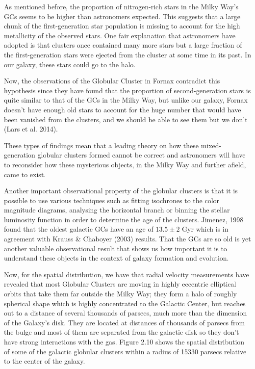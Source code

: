 As mentioned before, the proportion of nitrogen-rich stars in the Milky Way's GCs seems to be higher than astronomers expected. This suggests that a large chunk of the first-generation star population is missing to account for the high metallicity of the observed stars. One fair explanation that astronomers have adopted is that clusters once contained many more stars but a large fraction of the first-generation stars were ejected from the cluster at some time in its past. In our galaxy, these stars could go to the halo.

Now, the observations of the Globular Cluster in Fornax contradict this hypothesis since they have found that the proportion of second-generation stars is quite similar to that of the GCs in the Milky Way, but unlike our galaxy, Fornax doesn't have enough old stars to account for the huge number that would have been vanished from the clusters, and we should be able to see them but we don't (Lars et al. 2014).

These types of findings mean that a leading theory on how these mixed-generation globular clusters formed cannot be correct and astronomers will have to reconsider how these mysterious objects, in the Milky Way and further afield, came to exist.

Another important observational property of the globular clusters is that it is possible to use various techniques such as fitting isochrones to the color magnitude diagrams,  analysing the horizontal branch or binning the stellar luminosity function in order to determine the age of the clusters. Jimenez, 1998 found that the oldest galactic GCs have an age of $13.5 \pm 2$ Gyr which is in agreement with  Krauss \& Chaboyer (2003) results. That the GCs are so old is yet another valuable observational result that shows us how important it is to understand these objects in the context of galaxy formation and evolution. 

Now, for the spatial distribution, we have that radial velocity measurements have revealed that most Globular Clusters are moving in highly eccentric elliptical orbits that take them far outside the Milky Way; they form a halo of roughly spherical shape which is highly concentrated to the Galactic Center, but reaches out to a distance of several thousands of parsecs, much more than the dimension of the Galaxy's disk. They are located at distances of thousands of parsecs from the bulge and most of them are separated from the galactic disk so they don't have strong interactions with the gas. Figure 2.10 shows the spatial distribution of some of the galactic globular clusters within a radius of 15330 parsecs relative to the center of the galaxy.       

